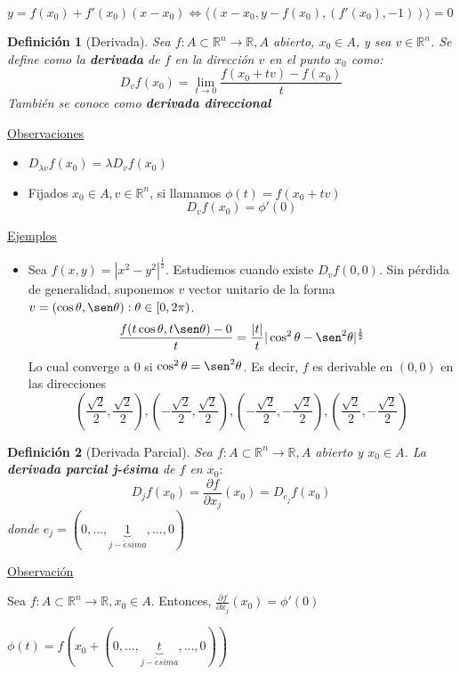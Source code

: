 \documentclass[10pt,a4paper,openright]{book}
\theoremstyle{break}
\newtheorem*{defi}{Definición}
\begin{document}
$y= f(x_0) + f'(x_0)(x - x_0) \Leftrightarrow \langle (x-x_0, y - f(x_0), (f'(x_0), - 1)) \rangle = 0$

\begin{defi}[Derivada]
Sea $f:A \subset \mathbb{R}^n \to \mathbb{R}, A$ abierto, $x_0 \in A$, y sea $v \in \mathbb{R}^n$. Se define como la \textbf{derivada} de $f$ en la dirección $v$ en el punto $x_0$ como:
$$D_v f(x_0) = \lim_{t \to 0} \frac{f(x_0 + tv) - f(x_0)}{t}$$
También se conoce como \textbf{derivada direccional}
\end{defi}

\underline{Observaciones}
\begin{itemize}
\item $D_{\lambda v} f(x_0) = \lambda D_v f(x_0)$
\item Fijados $x_0 \in A, v \in \mathbb{R}^n$, si llamamos $\phi(t) = f(x_0 + tv)$
$$D_v f(x_0) = \phi'(0)$$
\end{itemize}

\underline{Ejemplos}
\begin{itemize}
\item Sea $f(x,y) = |x^2 - y^2|^{\frac{1}{2}}$. Estudiemos cuando existe $D_v f(0,0)$. Sin pérdida de generalidad, suponemos $v$ vector unitario de la forma $v = (\cos \theta, \sen \theta) : \theta \in [0,2\pi)$.
$$\frac{f(t\cos\theta , t \sen \theta) - 0}{t} = \frac{|t|}{t} |\cos^2\theta - \sen^2\theta|^\frac{1}{2}$$
Lo cual converge a $0$ si $\cos^2\theta = \sen^2\theta$. Es decir, $f$ es derivable en $(0,0)$ en las direcciones 
$$\left( \frac{\sqrt{2}}{2},\frac{\sqrt{2}}{2} \right), \left( -\frac{\sqrt{2}}{2},\frac{\sqrt{2}}{2} \right),\left( -\frac{\sqrt{2}}{2},-\frac{\sqrt{2}}{2} \right),\left( \frac{\sqrt{2}}{2},-\frac{\sqrt{2}}{2} \right)  $$

\end{itemize}

\begin{defi}[Derivada Parcial]
Sea $f: A \subset \mathbb{R}^n \to \mathbb{R}, A$ abierto y $x_0 \in A$. La \textbf{derivada parcial j-ésima} de $f$ en $x_0:$
$$D_j f(x_0) = \frac{\partial f}{\partial x_j} (x_0) = D_{e_j} f(x_0)$$
donde $e_j = (0, \ldots, \underbrace{1}_{j-\acute{e}sima}, \ldots, 0)$
\end{defi}

\underline{Observación}

Sea $f: A \subset \mathbb{R}^n \to \mathbb{R}, x_0 \in A$. Entonces, $\frac{\partial f}{\partial x_j} (x_0) =\phi'(0) $

$\phi(t) = f(x_0 + (0, \ldots,  \underbrace{t}_{j-\acute{e}sima}, \ldots, 0))$
\end{document}
